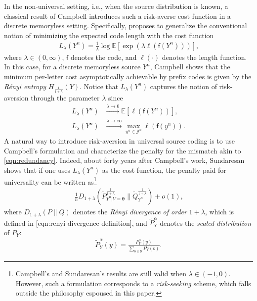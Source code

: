 \documentclass[journal, 10pt]{IEEEtran}
\newcommand{\bbE}{\mathbb{E}}
\newcommand{\sff}{\mathsf{f}}
\newcommand{\cY}{\mathcal{Y}}
\theoremstyle{plain}
\theoremstyle{plain}
\theoremstyle{plain}
\theoremstyle{plain}
\newcommand{\boldtheta}{\mathbold{\theta}}
\begin{document}
In the non-universal setting, i.e., when the source distribution is known, a classical result of Campbell \cite{Campbell1965} introduces such a risk-averse cost function in a discrete memoryless setting. Specifically, \cite{Campbell1965} proposes to generalize the conventional notion of minimizing the expected code length with the cost function
\begin{align}
	L_\lambda(Y^n)=\frac{1}{\lambda}\log\bbE \left[ \exp (\lambda \ell(\sff(Y^n) ) ) \right]\text{,}
\end{align}
where $\lambda\in (0, \infty) $, $\sff$ denotes the code, and $\ell(\cdot) $ denotes the length function. In this case, for a discrete memoryless source $Y^n$, Campbell \cite{Campbell1965} shows that the minimum per-letter cost asymptotically achievable by prefix codes is given by the \emph{R\'enyi entropy} $H_\frac{1}{1+\lambda}(Y)$. Notice that $L_\lambda(Y^n)$ captures the notion of risk-aversion through the parameter $\lambda$ since
\begin{align}
	L_\lambda(Y^n) &\xrightarrow{\lambda \to 0}  \bbE\left[ \ell(\sff(Y^n)) \right]\text{,} \\
	L_\lambda(Y^n) &\xrightarrow{\lambda \to \infty} \max_{y^n \in \cY^n} \ell(\sff(y^n))\text{.}
\end{align}
A natural way to introduce risk-aversion in universal source coding is to use Campbell's formulation and characterize the penalty for the mismatch akin to \eqref{eqn:redundancy}. Indeed, about forty years after Campbell's work, Sundaresan \cite[Theorem 8]{Sundaresan2007} shows that if one uses $L_\lambda(Y^n)$ as the cost function, the penalty paid for universality can be written as\footnote{Campbell's and Sundaresan's results are still valid when $\lambda \in (-1,0)$. However, such a formulation corresponds to a \emph{risk-seeking} scheme, which falls outside the philosophy espoused in this paper.}
\begin{align}
	\frac{1}{n} D_{1+\lambda}(\widetilde{P}_{Y^n|V=\boldtheta}^{\frac{1}{1+\lambda} }\| \widetilde{Q}_{Y^n}^{\frac{1}{1+\lambda} } )+o(1)\text{,}
\end{align}
where $D_{1+\lambda}(P\|Q)$ denotes the \emph{R\'enyi divergence of order} $1+\lambda$, which is defined in \eqref{eqn:renyi divergence definition}, and $\widetilde{P}_Y^\alpha$ denotes the \emph{scaled distribution} of $P_Y$:
\begin{align}
	\widetilde{P}_Y^\alpha(y)=\frac{P_Y^\alpha(y)}{\sum_{b\in \cY }P_Y^\alpha (b)}\text{.} \label{eqn:scaled-distribution}
\end{align}
\end{document}
